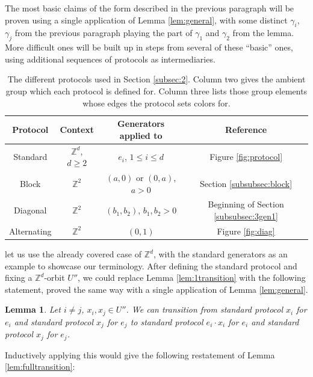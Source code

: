 \documentclass[10pt,a4paper]{article}
\newcommand{\0}{\varnothing}
\newcommand{\Z}{\mathbb{Z}}
\newtheorem{lemma}{Lemma}
\begin{document}
The most basic claims of the form described in the previous paragraph will be proven using a single application of Lemma \ref{lem:general}, with some distinct $\gamma_i$, $\gamma_j$ from the previous paragraph playing the part of $\gamma_1$ and $\gamma_2$ from the lemma. More difficult ones will be built up in steps from several of these ``basic'' ones, using additional sequences of protocols as intermediaries. 


\begin{table}[]
    \centering
    \begin{tabular}{| c | c | c | c |}
        \hline 
        Protocol & Context & Generators applied to & Reference \\
        \hline
        \hline
        Standard & $\Z^d$, $d \geq 2$ & $e_i$, $1 \leq i \leq d$ & Figure \ref{fig:protocol} \\
        \hline
        Block & $\Z^2$ & $(a,0)$ or $(0,a)$, $a > 0$ & Section \ref{subsubsec:block} \\
        \hline
        Diagonal & $\Z^2$ & $(b_1,b_2)$, $b_1,b_2 > 0$ & Beginning of Section \ref{subsubsec:3gen1} \\
        \hline
        Alternating & $\Z^2$ & $(0,1)$ & Figure \ref{fig:diag} \\
        \hline
    \end{tabular}
    \caption{The different protocols used in Section \ref{subsec:2}. Column two gives the ambient group which each protocol is defined for. Column three lists those group elements whose edges the protocol sets colors for.}
    \label{tab:protocols}
\end{table}

let us use the already covered case of $\Z^d$, with the standard generators as an example to showcase our terminology. After defining the standard protocol and fixing a $\Z^d$-orbit $U''$, we could replace Lemma \ref{lem:1transition} with the following statement, proved the same way with a single application of Lemma \ref{lem:general}.

\begin{lemma}
Let $i \neq j$, $x_i,x_j \in U''$. We can transition from standard protocol $x_i$ for $e_i$ and standard protocol $x_j$ for $e_j$ to standard protocol $e_i \cdot x_i$ for $e_i$ and standard protocol $x_j$ for $e_j$.
\end{lemma}

Inductively applying this would give the following restatement of Lemma \ref{lem:fulltransition}:
\end{document}

